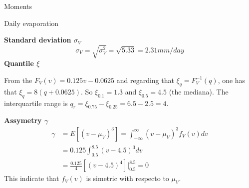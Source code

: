 \documentclass[8pt]{beamer}
\begin{document}
\begin{frame}{Moments}
    \begin{exampleblock}{Daily evaporation}
\begin{minipage}[t]{0.39\textwidth}
\centering
\textbf{Standard deviation $\sigma_V$}
\[
    \sigma_V = \sqrt{\sigma_V^2} = \sqrt{5.33} = 2.31 mm/day
\]
\textbf{Quantile $\xi$}

From the $F_V (v) = 0.125v - 0.0625$ and regarding that $\xi_q = F_V^{-1} (q)$, one has that $\xi_q = 8(q + 0.0625)$. So $\xi_{0.1} = 1.3$ and $\xi_{0.5} = 4.5$ (the mediana). The interquartile range is $q_r = \xi_{0.75} - \xi_{0.25} = 6.5 - 2.5 = 4$. 
\end{minipage}
\hfill
\begin{minipage}[t]{0.59\textwidth}
\centering
\textbf{Assymetry $\gamma$}
\begin{align*}
    \gamma &= E \left[ (v -\mu_V)^3 \right] = \int_{-\infty}^{\infty} (v-\mu_V)^3 f_V(v) dv \\
            &= 0.125 \int_{0.5}^{8.5}  (v-4.5)^3 dv\\ 
            &= \frac{0.125}{4} \left[ (v-4.5)^4 \right] \Big|_{0.5}^{8.5} = 0
\end{align*}
This indicate that $f_V(v)$ is simetric with respecto to $\mu_V$. 
\end{minipage}

    \end{exampleblock}
\end{frame}

\end{document}
